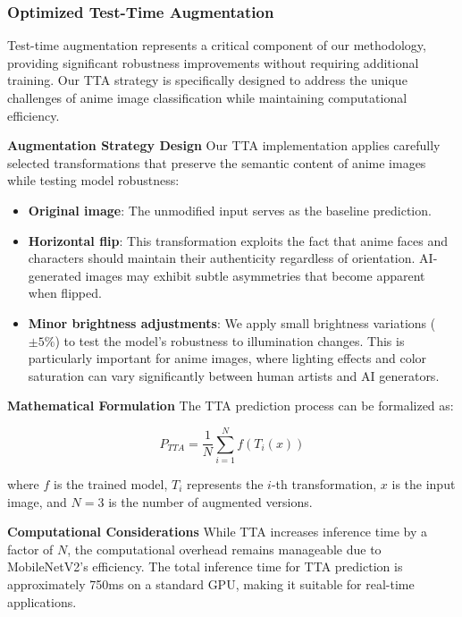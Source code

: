 \documentclass{article}
\begin{document}
\subsubsection{Optimized Test-Time Augmentation}

Test-time augmentation represents a critical component of our methodology, providing significant robustness improvements without requiring additional training. Our TTA strategy is specifically designed to address the unique challenges of anime image classification while maintaining computational efficiency.

\textbf{Augmentation Strategy Design}
Our TTA implementation applies carefully selected transformations that preserve the semantic content of anime images while testing model robustness:

\begin{itemize}
    \item \textbf{Original image}: The unmodified input serves as the baseline prediction.
    
    \item \textbf{Horizontal flip}: This transformation exploits the fact that anime faces and characters should maintain their authenticity regardless of orientation. AI-generated images may exhibit subtle asymmetries that become apparent when flipped.
    
    \item \textbf{Minor brightness adjustments}: We apply small brightness variations ($\pm 5\%$) to test the model's robustness to illumination changes. This is particularly important for anime images, where lighting effects and color saturation can vary significantly between human artists and AI generators.
\end{itemize}

\textbf{Mathematical Formulation}
The TTA prediction process can be formalized as:

\begin{equation}
    P_{TTA} = \frac{1}{N} \sum_{i=1}^{N} f(T_i(x))
\end{equation}

where $f$ is the trained model, $T_i$ represents the $i$-th transformation, $x$ is the input image, and $N=3$ is the number of augmented versions.

\textbf{Computational Considerations}
While TTA increases inference time by a factor of $N$, the computational overhead remains manageable due to MobileNetV2's efficiency. The total inference time for TTA prediction is approximately 750ms on a standard GPU, making it suitable for real-time applications.
\end{document}
